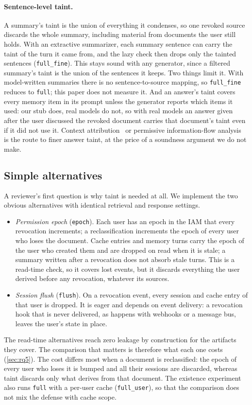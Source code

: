\paragraph{Sentence-level taint.}
A summary's taint is the union of everything it condenses, so one revoked source discards the whole
summary, including material from documents the user still holds. With an extractive summarizer, each
summary sentence can carry the taint of the turn it came from, and the lazy check then drops only the
tainted sentences (\texttt{full\_fine}). This stays sound with any generator, since a filtered
summary's taint is the union of the sentences it keeps. Two things limit it. With model-written
summaries there is no sentence-to-source mapping, so \texttt{full\_fine} reduces to \texttt{full};
this paper does not measure it. And an answer's taint covers every
memory item in its prompt unless the generator reports which items it used: our stub does, real
models do not, so with real models an answer given after the user discussed the revoked document
carries that document's taint even if it did not use it. Context
attribution~\cite{cohenwang2024contextcite} or permissive information-flow
analysis~\cite{siddiqui2024permissive} is the route to finer answer taint, at the price of a
soundness argument we do not make.

\subsection{Simple alternatives}
A reviewer's first question is why taint is needed at all. We implement the two obvious
alternatives with identical retrieval and response settings.
\begin{itemize}
\item \emph{Permission epoch} (\texttt{epoch}). Each user has an epoch in the IAM that every
revocation increments; a reclassification increments the epoch of every user who loses the
document. Cache entries and memory turns carry the epoch of the user who created them
and are dropped on read when it is stale; a summary written after a revocation does not absorb stale
turns. This is a read-time check, so it covers lost events, but it discards everything the user
derived before any revocation, whatever its sources.
\item \emph{Session flush} (\texttt{flush}). On a revocation event, every session and cache entry of
that user is dropped. It is eager and depends on event delivery: a revocation hook that is never
delivered, as happens with webhooks or a message bus, leaves the user's state in place.
\end{itemize}
The read-time alternatives reach zero leakage by construction for the artifacts they cover. The
comparison that matters is therefore what each one costs (\cref{sec:rq5}). The cost differs most
when a document is reclassified: the epoch of every user who loses it is bumped and all their
sessions are discarded, whereas taint discards only what derives from that document. The existence
experiment also runs \texttt{full} with a per-user cache (\texttt{full\_user}), so that the comparison
does not mix the defense with cache scope.

